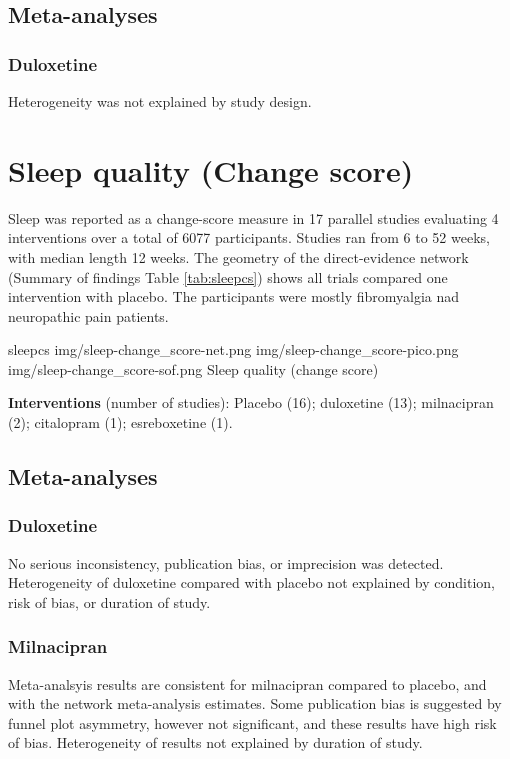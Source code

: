 \documentclass{report}\usepackage[]{graphicx}\usepackage[]{color}
\begin{document}
\subsection{Meta-analyses}

\subsubsection{Duloxetine}

Heterogeneity was not explained by study design.


\section{Sleep quality (Change score)}


Sleep was reported as a change-score measure in 17 parallel studies evaluating 4 interventions over a total of 6077 participants. Studies ran from 6 to 52 weeks, with median length 12 weeks. The geometry of the direct-evidence network (Summary of findings Table \ref{tab:sleepcs}) shows all trials compared one intervention with placebo. The participants were mostly fibromyalgia nad neuropathic pain patients.

\soffignew
{sleepcs}
{img/sleep-change_score-net.png}
{img/sleep-change_score-pico.png}
{img/sleep-change_score-sof.png}
{Sleep quality (change score)}

\textbf{Interventions} (number of studies): Placebo (16); duloxetine (13); milnacipran (2); citalopram (1); esreboxetine (1).

\subsection{Meta-analyses}

\subsubsection{Duloxetine}

No serious inconsistency, publication bias, or imprecision was detected. Heterogeneity of duloxetine compared with placebo not explained by condition, risk of bias, or duration of study.

\subsubsection{Milnacipran}

Meta-analsyis results are consistent for milnacipran compared to placebo, and with the network meta-analysis estimates. Some publication bias is suggested by funnel plot asymmetry, however not significant, and these results have high risk of bias. Heterogeneity of results not explained by duration of study.
\end{document}
